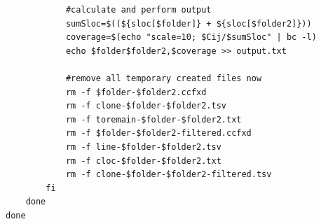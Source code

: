 \documentclass[a4paper,twoside, twocolumn, 11pt]{article}
\numberwithin{equation}{section}
\begin{document}
\begin{appendices}
\begin{verbatim}
            #calculate and perform output
            sumSloc=$((${sloc[$folder]} + ${sloc[$folder2]}))
            coverage=$(echo "scale=10; $Cij/$sumSloc" | bc -l)
            echo $folder$folder2,$coverage >> output.txt

            #remove all temporary created files now
            rm -f $folder-$folder2.ccfxd
            rm -f clone-$folder-$folder2.tsv
            rm -f toremain-$folder-$folder2.txt 
            rm -f $folder-$folder2-filtered.ccfxd
            rm -f line-$folder-$folder2.tsv
            rm -f cloc-$folder-$folder2.txt
            rm -f clone-$folder-$folder2-filtered.tsv
        fi
    done
done



\end{verbatim}
\end{appendices}
\end{document}
